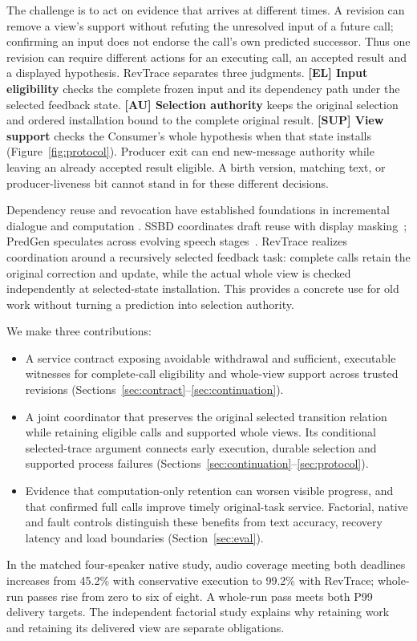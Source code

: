 The challenge is to act on evidence that arrives at different times.
A revision can remove a view's support without refuting the unresolved
input of a future call; confirming an input does not endorse the call's
own predicted successor. Thus one revision can require different actions
for an executing call, an accepted result and a displayed hypothesis.
RevTrace separates
three judgments. \textbf{[EL] Input eligibility} checks the complete frozen
input and its dependency path under the selected feedback state.
\textbf{[AU] Selection authority} keeps the original selection and ordered
installation bound to the complete original result. \textbf{[SUP] View
support} checks the Consumer's whole hypothesis when that state installs
(Figure~\ref{fig:protocol}). Producer exit can end new-message authority
while leaving an already accepted result eligible. A birth version,
matching text, or producer-liveness bit cannot stand in for these
different decisions.

Dependency reuse and revocation have established foundations in
incremental dialogue and computation
\cite{schlangen2011incremental,hammer2014adapton,hammer2015names}.
SSBD coordinates draft reuse with display masking~\cite{zeng2026ssbd};
PredGen speculates across evolving speech stages~\cite{li2025predgen}.
RevTrace realizes coordination around a recursively selected feedback
task: complete calls retain the original correction and update, while
the actual whole view is checked independently at selected-state
installation. This provides a concrete use for old work without turning
a prediction into selection authority.

We make three contributions:
\begin{itemize}
\item A service contract exposing avoidable withdrawal and sufficient,
  executable witnesses for complete-call eligibility and whole-view
  support across trusted revisions
  (Sections~\ref{sec:contract}--\ref{sec:continuation}).
\item A joint coordinator that preserves the original selected transition
  relation while retaining eligible calls and supported whole views.
  Its conditional selected-trace argument connects early execution,
  durable selection and supported process failures
  (Sections~\ref{sec:continuation}--\ref{sec:protocol}).
\item Evidence that computation-only retention can worsen visible
  progress, and that confirmed full calls improve timely original-task
  service. Factorial, native and fault controls distinguish these benefits
  from text accuracy, recovery latency and load boundaries
  (Section~\ref{sec:eval}).
\end{itemize}

In the matched four-speaker native study, audio coverage meeting both
deadlines increases from 45.2\% with conservative execution to 99.2\% with
RevTrace; whole-run passes rise from zero to six of eight. A whole-run
pass meets both P99 delivery targets. The independent factorial study explains why
retaining work and retaining its delivered view are separate obligations.
